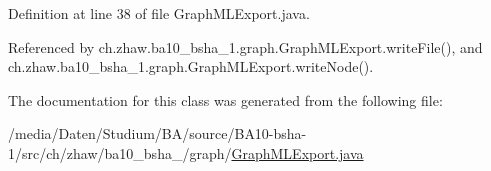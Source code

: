 Definition at line 38 of file GraphMLExport.java.

Referenced by ch.zhaw.ba10\_\-bsha\_\-1.graph.GraphMLExport.writeFile(), and ch.zhaw.ba10\_\-bsha\_\-1.graph.GraphMLExport.writeNode().

The documentation for this class was generated from the following file:\begin{DoxyCompactItemize}
\item 
/media/Daten/Studium/BA/source/BA10-\/bsha-\/1/src/ch/zhaw/ba10\_\-bsha\_/graph/\hyperlink{GraphMLExport_8java}{GraphMLExport.java}\end{DoxyCompactItemize}
